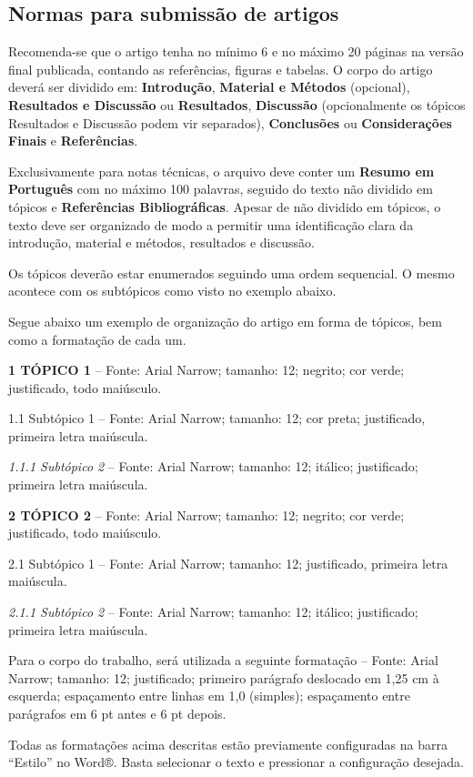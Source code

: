 \subsection{Normas para submissão de artigos}

Recomenda-se que o artigo tenha no mínimo 6 e no máximo 20 páginas na versão final publicada, contando as referências, figuras e tabelas. O corpo do artigo deverá ser dividido em: \textbf{Introdução}, \textbf{Material e Métodos} (opcional), \textbf{Resultados e Discussão} ou \textbf{Resultados}, \textbf{Discussão} (opcionalmente os tópicos Resultados e Discussão podem vir separados), \textbf{Conclusões} ou \textbf{Considerações Finais} e \textbf{Referências}.

Exclusivamente para notas técnicas, o arquivo deve conter um \textbf{Resumo em Português} com no máximo 100 palavras, seguido do texto não dividido em tópicos e \textbf{Referências Bibliográficas}. Apesar de não dividido em tópicos, o texto deve ser organizado de modo a permitir uma identificação clara da introdução, material e métodos, resultados e discussão.

Os tópicos deverão estar enumerados seguindo uma ordem sequencial. O mesmo acontece com os subtópicos como visto no exemplo abaixo.

Segue abaixo um exemplo de organização do artigo em forma de tópicos, bem como a formatação de cada um.

\textbf{1 TÓPICO 1} – Fonte: Arial Narrow; tamanho: 12; negrito; cor verde; justificado, todo maiúsculo.

1.1 Subtópico 1 – Fonte: Arial Narrow; tamanho: 12; cor preta; justificado, primeira letra maiúscula.

\textit{1.1.1 Subtópico 2} – Fonte: Arial Narrow; tamanho: 12; itálico; justificado; primeira letra maiúscula.

\textbf{2 TÓPICO 2} – Fonte: Arial Narrow; tamanho: 12; negrito; cor verde; justificado, todo maiúsculo.

2.1 Subtópico 1 – Fonte: Arial Narrow; tamanho: 12; justificado, primeira letra maiúscula.

\textit{2.1.1 Subtópico 2} – Fonte: Arial Narrow; tamanho: 12; itálico; justificado; primeira letra maiúscula.

Para o corpo do trabalho, será utilizada a seguinte formatação – Fonte: Arial Narrow; tamanho: 12; justificado; primeiro parágrafo deslocado em 1,25 cm à esquerda; espaçamento entre linhas em 1,0 (simples); espaçamento entre parágrafos em 6 pt antes e 6 pt depois.

Todas as formatações acima descritas estão previamente configuradas na barra ``Estilo'' no Word®. Basta selecionar o texto e pressionar a configuração desejada.
